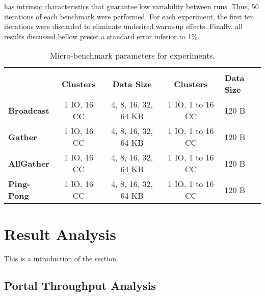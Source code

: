 			\mppa has intrinsic characteristics that guarantee low variability
			between runs. Thus, 50 iterations of each benchmark were performed.
			For each experiment, the first ten iterations were discarded to
			eliminate undesired warm-up effects. Finally, all results discussed
			bellow preset a standard error inferior to 1\%.

			\begin{table}[!tb]
				\centering%
				\caption{Micro-benchmark parameters for experiments.}%
				\label{tab:benchmarks-parameters}%

				\begin{tabular}{l|c|c|c|l|}
					\cline{2-5}
															 & \multicolumn{2}{c|}{\textbf{\portal}}   & \multicolumn{2}{c|}{\textbf{\mailbox}} \\ \cline{2-5}
															 & \textbf{Clusters} & \textbf{Data Size}  & \textbf{Clusters} & \textbf{Data Size} \\ \hline
					\multicolumn{1}{|l|}{\textbf{Broadcast}} & 1 IO, 16 CC       & 4, 8, 16, 32, 64 KB & 1 IO, 1 to 16 CC  & 120 B              \\ \hline
					\multicolumn{1}{|l|}{\textbf{Gather}}    & 1 IO, 16 CC       & 4, 8, 16, 32, 64 KB & 1 IO, 1 to 16 CC  & 120 B              \\ \hline
					\multicolumn{1}{|l|}{\textbf{AllGather}} & 1 IO, 16 CC       & 4, 8, 16, 32, 64 KB & 1 IO, 1 to 16 CC  & 120 B              \\ \hline
					\multicolumn{1}{|l|}{\textbf{Ping-Pong}} & 1 IO, 16 CC       & 4, 8, 16, 32, 64 KB & 1 IO, 1 to 16 CC  & 120 B              \\ \hline
				\end{tabular}

			\end{table}


	\section{Result Analysis}
	\label{sec.results-analysis}

		This is a introduction of the section.

		\subsection{Portal Throughput Analysis}


